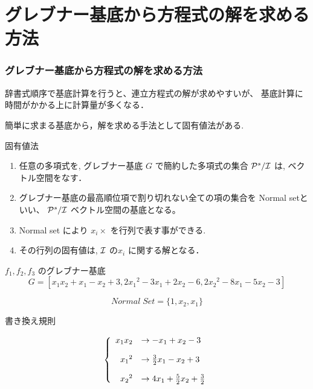 \documentclass[dvipdfmx,11pt,notheorems]{beamer}
\theoremstyle{definition}
\begin{document}
\section{グレブナー基底から方程式の解を求める方法}
\begin{frame}\frametitle{グレブナー基底から方程式の解を求める方法}
辞書式順序で基底計算を行うと、連立方程式の解が求めやすいが、
基底計算に時間がかかる上に計算量が多くなる．

簡単に求まる基底から，解を求める手法として固有値法がある.

\begin{block}{固有値法}
\begin{enumerate}
\item 任意の多項式を, グレブナー基底 $G$ で簡約した多項式の集合 
${\cal P}^s /{\cal I}$ は, ベクトル空間をなす．

\item グレブナー基底の最高順位項で割り切れない全ての項の集合を
Normal setといい、 ${\cal P}^s /{\cal I}$ ベクトル空間の基底となる。

\item Normal set により $x_i \times $ を行列で表す事ができる.

\item その行列の固有値は, ${\cal I}$ の$x_i$ に関する解となる．
\end{enumerate}
\end{block}
\end{frame}

\begin{frame}
\begin{block}{$f_1,f_2,f_3$ のグレブナー基底}
\[ G = [x_1 x_2 + x_1 - x_2 + 3, 2{x_1}^2-3x_1+2x_2-6,2{x_2}^2-8x_1-5x_2-3] \]

\[Normal \; Set =  \{1,x_2,x_1\}\]
\end{block}

\begin{block}{書き換え規則}

\[ \left\{
\begin{array}{rl}
x_1x_2 & \rightarrow  -x_1+x_2-3\vspace{.15in}\\
{x_1}^2 & \rightarrow  \frac{3}{2}x_1-x_2+3\vspace{.15in}\\
{x_2}^2 & \rightarrow  4x_1+\frac{5}{2}x_2+\frac{3}{2}
\end{array}
\right. \]
\end{block}
\end{frame}
\end{document}
